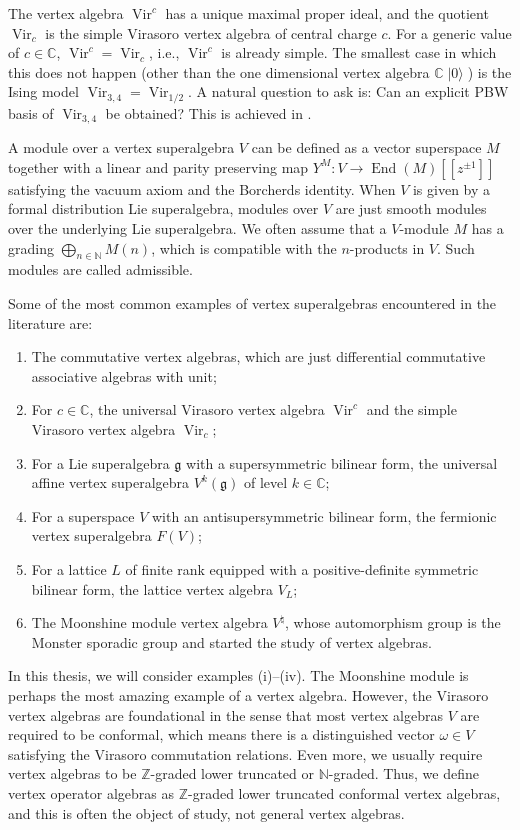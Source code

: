 \documentclass[a4paper, 12pt, reqno]{amsart}
\theoremstyle{remark}
\DeclareMathOperator{\Vir}{Vir}
\DeclareMathOperator{\End}{End}
\DeclareMathOperator{\vac}{|0\rangle}
\begin{document}
The vertex algebra $\Vir^c$ has a unique maximal proper ideal, and the quotient $\Vir_c$ is the simple Virasoro vertex algebra of central charge $c$.
For a generic value of $c \in \mathbb{C}$, $\Vir^c = \Vir_c$, i.e., $\Vir^c$ is already simple.
The smallest case in which this does not happen (other than the one dimensional vertex algebra $\mathbb{C}\vac$) is the Ising model $\Vir_{3, 4} = \Vir_{1/2}$.
A natural question to ask is: Can an explicit PBW basis of $\Vir_{3, 4}$ be obtained?
This is achieved in \cite{andrews_singular_2022}.

A module over a vertex superalgebra $V$ can be defined as a vector superspace $M$ together with a linear and parity preserving map $Y^M: V \to \End(M)[[z^{\pm 1}]]$ satisfying the vacuum axiom and the Borcherds identity.
When $V$ is given by a formal distribution Lie superalgebra, modules over $V$ are just smooth modules over the underlying Lie superalgebra.
We often assume that a $V$-module $M$ has a grading $\bigoplus_{n \in \mathbb{N}}M(n)$, which is compatible with the $n$-products in $V$.
Such modules are called admissible.

Some of the most common examples of vertex superalgebras encountered in the literature are:
\begin{enumerate}
\item The commutative vertex algebras, which are just differential commutative associative algebras with unit;
\item For $c \in \mathbb{C}$, the universal Virasoro vertex algebra $\Vir^c$ and the simple Virasoro vertex algebra $\Vir_c$;
\item For a Lie superalgebra $\mathfrak{g}$ with a supersymmetric bilinear form, the universal affine vertex superalgebra $V^k(\mathfrak{g})$ of level $k \in \mathbb{C}$;
\item For a superspace $V$ with an antisupersymmetric bilinear form, the fermionic vertex superalgebra $F(V)$;
\item For a lattice $L$ of finite rank equipped with a positive-definite symmetric bilinear form, the lattice vertex algebra $V_L$;
\item The Moonshine module vertex algebra $V^{\natural}$, whose automorphism group is the Monster sporadic group and started the study of vertex algebras.
\end{enumerate}
In this thesis, we will consider examples (i)--(iv).
The Moonshine module is perhaps the most amazing example of a vertex algebra.
However, the Virasoro vertex algebras are foundational in the sense that most vertex algebras $V$ are required to be conformal, which means there is a distinguished vector $\omega \in V$ satisfying the Virasoro commutation relations.
Even more, we usually require vertex algebras to be $\mathbb{Z}$-graded lower truncated or $\mathbb{N}$-graded.
Thus, we define vertex operator algebras as $\mathbb{Z}$-graded lower truncated conformal vertex algebras, and this is often the object of study, not general vertex algebras.
\end{document}
